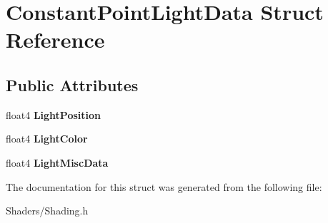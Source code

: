 \hypertarget{structConstantPointLightData}{}\section{Constant\+Point\+Light\+Data Struct Reference}
\label{structConstantPointLightData}
\subsection*{Public Attributes}
\begin{DoxyCompactItemize}
\item 
\mbox{\label{structConstantPointLightData_ade4754202337060d29034a8273a58195}} 
float4 {\bfseries Light\+Position}
\item 
\mbox{\label{structConstantPointLightData_a2582f88b45d7430cde1f3578f67a1200}} 
float4 {\bfseries Light\+Color}
\item 
\mbox{\label{structConstantPointLightData_adfcad818cf7c1c0a4c17b5e17ec2ca4d}} 
float4 {\bfseries Light\+Misc\+Data}
\end{DoxyCompactItemize}


The documentation for this struct was generated from the following file\+:\begin{DoxyCompactItemize}
\item 
Shaders/Shading.\+h\end{DoxyCompactItemize}
